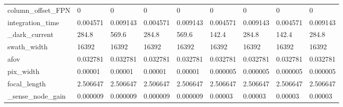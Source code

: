 \begin{tabular}{lllllllll}
column\_offset\_FPN      &                 0 &                 0 &                 0 &                 0 &                 0 &                 0 &                 0 &                 0 \\
integration\_time       &          0.004571 &          0.009143 &          0.004571 &          0.009143 &          0.004571 &          0.009143 &          0.004571 &          0.009143 \\
\_dark\_current          &             284.8 &             569.6 &             284.8 &             569.6 &             142.4 &             284.8 &             142.4 &             284.8 \\
swath\_width            &             16392 &             16392 &             16392 &             16392 &             16392 &             16392 &             16392 &             16392 \\
afov                   &          0.032781 &          0.032781 &          0.032781 &          0.032781 &          0.032781 &          0.032781 &          0.032781 &          0.032781 \\
pix\_width              &           0.00001 &           0.00001 &           0.00001 &           0.00001 &          0.000005 &          0.000005 &          0.000005 &          0.000005 \\
focal\_length           &          2.506647 &          2.506647 &          2.506647 &          2.506647 &          2.506647 &          2.506647 &          2.506647 &          2.506647 \\
\_sense\_node\_gain       &          0.000009 &          0.000009 &          0.000009 &          0.000009 &           0.00003 &           0.00003 &           0.00003 &           0.00003 \\
\bottomrule
\end{tabular}
